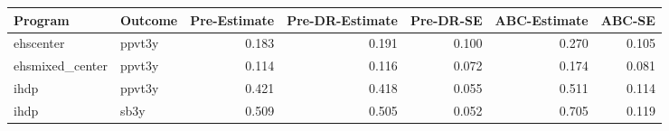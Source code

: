 \begin{table}[ht]
\centering
\begin{tabular}{llrrrrr}
  \hline
Program & Outcome & Pre-Estimate & Pre-DR-Estimate & Pre-DR-SE & ABC-Estimate & ABC-SE \\ 
  \hline
ehscenter & ppvt3y & 0.183 & 0.191 & 0.100 & 0.270 & 0.105 \\ 
  ehsmixed\_center & ppvt3y & 0.114 & 0.116 & 0.072 & 0.174 & 0.081 \\ 
  ihdp & ppvt3y & 0.421 & 0.418 & 0.055 & 0.511 & 0.114 \\ 
  ihdp & sb3y & 0.509 & 0.505 & 0.052 & 0.705 & 0.119 \\ 
   \hline
\end{tabular}
\end{table}
